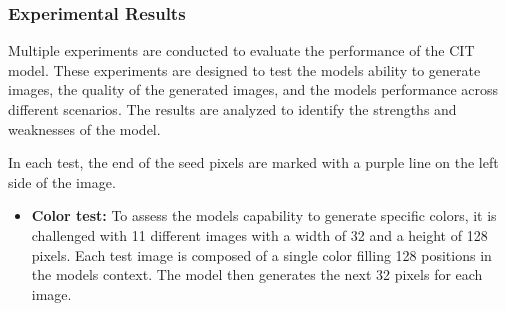     \subsubsection{Experimental Results}

    Multiple experiments are conducted to evaluate the performance of the CIT model. These experiments are designed to test the models ability to generate images, the quality of the generated images, and the models performance across different scenarios. The results are analyzed to identify the strengths and weaknesses of the model.
    
    In each test, the end of the seed pixels are marked with a purple line on the left side of the image.
    
    \begin{itemize}
        \item \textbf{Color test:} To assess the models capability to generate specific colors, it is challenged with 11 different images with a width of 32 and a height of 128 pixels. Each test image is composed of a single color filling 128 positions in the models context. The model then generates the next 32 pixels for each image.
    

\end{itemize}

